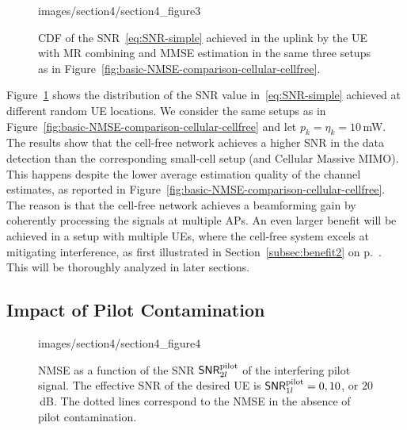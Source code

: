 \begin{figure}[t!]
	\begin{overpic}[width=\columnwidth,tics=10]{images/section4/section4_figure3}
\end{overpic} 
                \caption{CDF of the SNR~\eqref{eq:SNR-simple} achieved in the uplink by the UE with MR combining and MMSE estimation in the same three setups as in Figure~\ref{fig:basic-NMSE-comparison-cellular-cellfree}.}    \vspace{+2mm}
	\label{fig:basic-signal-gain-comparison-cellular-cellfree} 
\end{figure}

Figure~\ref{fig:basic-signal-gain-comparison-cellular-cellfree} shows the distribution of the SNR value in~\eqref{eq:SNR-simple} achieved at different random UE locations. We consider the same setups as in Figure~\ref{fig:basic-NMSE-comparison-cellular-cellfree} and let $p_k = \eta_k = 10$\,mW.
The results show that the cell-free network achieves a higher \gls{SNR} in the data detection than the corresponding small-cell setup (and Cellular Massive MIMO). This happens despite the lower average estimation quality of the channel estimates, as reported in Figure~\ref{fig:basic-NMSE-comparison-cellular-cellfree}. The reason is that the cell-free network achieves a beamforming gain by coherently processing the signals at multiple APs. 
An even larger benefit will be achieved in a  setup with multiple UEs, where the cell-free system excels at mitigating interference, as first illustrated in Section~\ref{subsec:benefit2} on p.~\pageref{subsec:benefit2}. This will be thoroughly analyzed in later sections.


\enlargethispage{\baselineskip}

\subsection{Impact of Pilot Contamination}


\begin{figure}[t!]
	\begin{overpic}[width=\columnwidth,tics=10]{images/section4/section4_figure4}
\end{overpic} 
                \caption{NMSE as a function of the SNR ${\mathsf{SNR}_{2l}^{\text{pilot}}}$ of the interfering pilot signal. The effective SNR of the desired UE is $\mathsf{SNR}_{1l}^{\text{pilot}} =0, 10$, or $20$\,dB. The dotted lines correspond to the NMSE in the absence of pilot contamination.}    \vspace{+2mm}
	\label{fig:basic-NMSE-pilot-contamination-effect} 
\end{figure}

